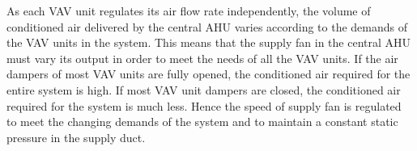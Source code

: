 

As each VAV unit regulates its air flow rate independently, the volume of conditioned air delivered by the central AHU varies according to the demands of the VAV units in the system. This means that the supply fan in the central AHU must vary its output in order to meet the needs of all the VAV units. If the air dampers of most VAV units are fully opened, the conditioned air required for the entire system is high. If most VAV unit dampers are closed, the conditioned air required for the system is much less. Hence the speed of supply fan is regulated to meet the changing demands of the system and to maintain a constant static pressure in the supply duct. 

